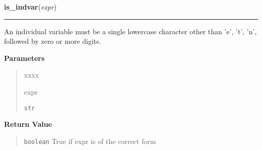     \label{temporaldrt:is_indvar}

    \vspace{0.5ex}

\hspace{.8\funcindent}\begin{boxedminipage}{\funcwidth}

    \raggedright \textbf{is\_indvar}(\textit{expr})

    \vspace{-1.5ex}

    \rule{\textwidth}{0.5\fboxrule}
\setlength{\parskip}{2ex}
    An individual variable must be a single lowercase character other than 
    'e', 't', 'n', followed by zero or more digits.

\setlength{\parskip}{1ex}
      \textbf{Parameters}
      \vspace{-1ex}

      \begin{quote}
        \begin{Ventry}{xxxx}

          \item[expr]

          \texttt{str}

        \end{Ventry}

      \end{quote}

      \textbf{Return Value}
    \vspace{-1ex}

      \begin{quote}
      \texttt{boolean} True if expr is of the correct form

      \end{quote}

    \end{boxedminipage}

    \label{temporaldrt:is_propername}

    \vspace{0.5ex}

